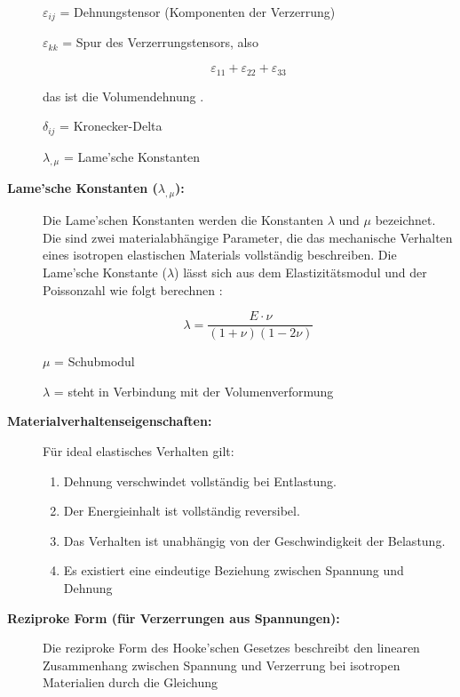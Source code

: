 \begin{description}
	$\varepsilon_{ij}$ = Dehnungstensor (Komponenten der Verzerrung)
	
	$\varepsilon_{kk}$ = Spur des Verzerrungstensors, also

	\begin{equation}
		\varepsilon_{11} + \varepsilon_{22} + \varepsilon_{33}
	\end{equation}
	
	das ist die Volumendehnung \cite{elastomechanik:Grundlagen der Elastizitaetstheorie}.
	 
	 $\delta_{ij}$ = Kronecker-Delta 
	 
	 $\lambda_{,\mu}$ = Lame’sche Konstanten
	 
	 \item[\textbf{Lame’sche Konstanten ($\lambda_{,\mu}$):}] Die Lame'schen Konstanten werden die Konstanten $\lambda$ und $\mu$ bezeichnet. 
	 Die sind zwei materialabhängige Parameter, die das mechanische Verhalten eines isotropen elastischen Materials vollständig beschreiben.
	 Die Lame’sche Konstante ($\lambda$) lässt sich aus dem Elastizitätsmodul und der Poissonzahl wie folgt berechnen \cite{elastomechanik:Grundlagen der Elastizitaetstheorie}:
	 
	 \begin{equation}
	 	\lambda = 
	 	\frac{E \cdot \nu}{(1 + \nu)(1 - 2\nu)}
	 \end{equation}
	 
	 $\mu$ = Schubmodul
	 
	 $\lambda$ = steht in Verbindung mit der Volumenverformung
	 
	 \item[\textbf{Materialverhaltenseigenschaften:}] Für ideal elastisches Verhalten gilt:
	 
	 \begin{enumerate}
	 	\item Dehnung verschwindet vollständig bei Entlastung.
	 	
	 	\item Der Energieinhalt ist vollständig reversibel.
	 	
	 	\item Das Verhalten ist unabhängig von der Geschwindigkeit der Belastung.
	 	
	 	\item Es existiert eine eindeutige Beziehung zwischen Spannung und Dehnung
	 \end{enumerate}
	 
	 \item[\textbf{Reziproke Form (für Verzerrungen aus Spannungen):}] Die reziproke Form des Hooke’schen Gesetzes beschreibt den linearen Zusammenhang zwischen Spannung und Verzerrung bei isotropen Materialien durch die Gleichung
	 

\end{description}
